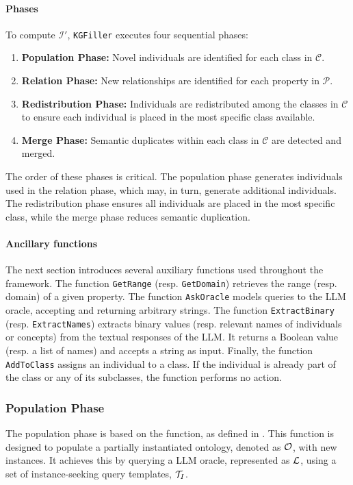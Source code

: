 \paragraph{Phases}
To compute \(\mathcal{I}'\), \texttt{KGFiller} executes four sequential phases:
%
\begin{enumerate}
    \item \textbf{Population Phase:} Novel individuals are identified for each class in \(\mathcal{C}\).
    \item \textbf{Relation Phase:} New relationships are identified for each property in \(\mathcal{P}\).
    \item \textbf{Redistribution Phase:} Individuals are redistributed among the classes in \(\mathcal{C}\) to ensure each individual is placed in the most specific class available.
    \item \textbf{Merge Phase:} Semantic duplicates within each class in \(\mathcal{C}\) are detected and merged.
\end{enumerate}
%
The order of these phases is critical.
%
The population phase generates individuals used in the relation phase, which may, in turn, generate additional individuals.
%
The redistribution phase ensures all individuals are placed in the most specific class, while the merge phase reduces semantic duplication.


\paragraph{Ancillary functions}
%
The next section introduces several auxiliary functions used throughout the framework.
%
The function \texttt{GetRange} (resp. \texttt{GetDomain}) retrieves the range (resp. domain) of a given property.
%
The function \texttt{AskOracle} models queries to the \gls{LLM} oracle, accepting and returning arbitrary strings.
%
The function \texttt{ExtractBinary} (resp. \texttt{ExtractNames}) extracts binary values (resp. relevant names of individuals or concepts) from the textual responses of the \gls{LLM}.
%
It returns a Boolean value (resp. a list of names) and accepts a string as input.
%
Finally, the function \texttt{AddToClass} assigns an individual to a class.
%
If the individual is already part of the class or any of its subclasses, the function performs no action.


\subsubsection{Population Phase}
\label{subsubsec:population-phase}
%

%
The population phase is based on the \populate{} function, as defined in .
%
This function is designed to populate a partially instantiated ontology, denoted as $\relset{O}$, with new instances.
%
It achieves this by querying a \gls{LLM} oracle, represented as $\relset{L}$, using a set of instance-seeking query templates, $\relset{T}_{I}$.


